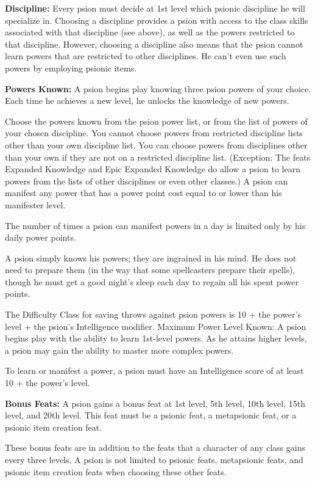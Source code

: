 \textbf{Discipline:} Every psion must decide at 1st level which psionic discipline he will specialize in. Choosing a discipline provides a psion with access to the class skills associated with that discipline (see above), as well as the powers restricted to that discipline. However, choosing a discipline also means that the psion cannot learn powers that are restricted to other disciplines. He can't even use such powers by employing psionic items.

\textbf{Powers Known:} A psion begins play knowing three psion powers of your choice. Each time he achieves a new level, he unlocks the knowledge of new powers.

Choose the powers known from the psion power list, or from the list of powers of your chosen discipline. You cannot choose powers from restricted discipline lists other than your own discipline list. You can choose powers from disciplines other than your own if they are not on a restricted discipline list. (Exception: The feats Expanded Knowledge and Epic Expanded Knowledge do allow a psion to learn powers from the lists of other disciplines or even other classes.) A psion can manifest any power that has a power point cost equal to or lower than his manifester level.

The number of times a psion can manifest powers in a day is limited only by his daily power points.

A psion simply knows his powers; they are ingrained in his mind. He does not need to prepare them (in the way that some spellcasters prepare their spells), though he must get a good night's sleep each day to regain all his spent power points.

The Difficulty Class for saving throws against psion powers is 10 + the power's level + the psion's Intelligence modifier. Maximum Power Level Known: A psion begins play with the ability to learn 1st-level powers. As he attains higher levels, a psion may gain the ability to master more complex powers.

To learn or manifest a power, a psion must have an Intelligence score of at least 10 + the power's level.

\textbf{Bonus Feats:} A psion gains a bonus feat at 1st level, 5th level, 10th level, 15th level, and 20th level. This feat must be a psionic feat, a metapsionic feat, or a psionic item creation feat.

These bonus feats are in addition to the feats that a character of any class gains every three levels. A psion is not limited to psionic feats, metapsionic feats, and psionic item creation feats when choosing these other feats.

